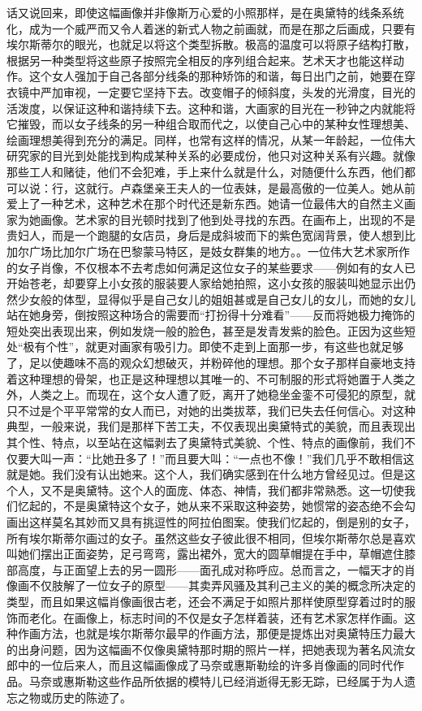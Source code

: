 \par 话又说回来，即使这幅画像并非像斯万心爱的小照那样，是在奥黛特的线条系统化，成为一个威严而又令人着迷的新式人物之前画就，而是在那之后画成，只要有埃尔斯蒂尔的眼光，也就足以将这个类型拆散。极高的温度可以将原子结构打散，根据另一种类型将这些原子按照完全相反的序列组合起来。艺术天才也能这样动作。这个女人强加于自己各部分线条的那种矫饰的和谐，每日出门之前，她要在穿衣镜中严加审视，一定要它坚持下去。改变帽子的倾斜度，头发的光滑度，目光的活泼度，以保证这种和谐持续下去。这种和谐，大画家的目光在一秒钟之内就能将它摧毁，而以女子线条的另一种组合取而代之，以使自己心中的某种女性理想美、绘画理想美得到充分的满足。同样，也常有这样的情况，从某一年龄起，一位伟大研究家的目光到处能找到构成某种关系的必要成份，他只对这种关系有兴趣。就像那些工人和赌徒，他们不会犯难，手上来什么就是什么，对随便什么东西，他们都可以说：行，这就行。卢森堡亲王夫人的一位表妹，是最高傲的一位美人。她从前爱上了一种艺术，这种艺术在那个时代还是新东西。她请一位最伟大的自然主义画家为她画像。艺术家的目光顿时找到了他到处寻找的东西。在画布上，出现的不是贵妇人，而是一个跑腿的女店员，身后是成斜坡而下的紫色宽阔背景，使人想到比加尔广场比加尔广场在巴黎蒙马特区，是妓女群集的地方。。一位伟大艺术家所作的女子肖像，不仅根本不去考虑如何满足这位女子的某些要求——例如有的女人已开始苍老，却要穿上小女孩的服装要人家给她拍照，这小女孩的服装叫她显示出仍然少女般的体型，显得似乎是自己女儿的姐姐甚或是自己女儿的女儿，而她的女儿站在她身旁，倒按照这种场合的需要而“打扮得十分难看”——反而将她极力掩饰的短处突出表现出来，例如发烧一般的脸色，甚至是发青发紫的脸色。正因为这些短处“极有个性”，就更对画家有吸引力。即使不走到上面那一步，有这些也就足够了，足以使趣味不高的观众幻想破灭，并粉碎他的理想。那个女子那样自豪地支持着这种理想的骨架，也正是这种理想以其唯一的、不可制服的形式将她置于人类之外，人类之上。而现在，这个女人遭了贬，离开了她稳坐金銮不可侵犯的原型，就只不过是个平平常常的女人而已，对她的出类拔萃，我们已失去任何信心。对这种典型，一般来说，我们是那样下苦工夫，不仅表现出奥黛特式的美貌，而且表现出其个性、特点，以至站在这幅剥去了奥黛特式美貌、个性、特点的画像前，我们不仅要大叫一声：“比她丑多了！”而且要大叫：“一点也不像！”我们几乎不敢相信这就是她。我们没有认出她来。这个人，我们确实感到在什么地方曾经见过。但是这个人，又不是奥黛特。这个人的面庞、体态、神情，我们都非常熟悉。这一切使我们忆起的，不是奥黛特这个女子，她从来不采取这种姿势，她惯常的姿态绝不会勾画出这样莫名其妙而又具有挑逗性的阿拉伯图案。使我们忆起的，倒是别的女子，所有埃尔斯蒂尔画过的女子。虽然这些女子彼此很不相同，但埃尔斯蒂尔总是喜欢叫她们摆出正面姿势，足弓弯弯，露出裙外，宽大的圆草帽提在手中，草帽遮住膝部高度，与正面望上去的另一圆形——面孔成对称呼应。总而言之，一幅天才的肖像画不仅肢解了一位女子的原型——其卖弄风骚及其利己主义的美的概念所决定的类型，而且如果这幅肖像画很古老，还会不满足于如照片那样使原型穿着过时的服饰而老化。在画像上，标志时间的不仅是女子怎样着装，还有艺术家怎样作画。这种作画方法，也就是埃尔斯蒂尔最早的作画方法，那便是提炼出对奥黛特压力最大的出身问题，因为这幅画不仅像奥黛特那时期的照片一样，把她表现为著名风流女郎中的一位后来人，而且这幅画像成了马奈或惠斯勒绘的许多肖像画的同时代作品。马奈或惠斯勒这些作品所依据的模特儿已经消逝得无影无踪，已经属于为人遗忘之物或历史的陈迹了。
